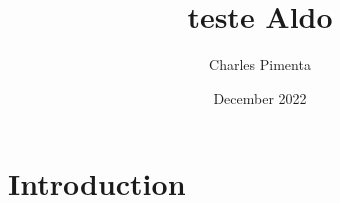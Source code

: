 \documentclass{article}
\title{teste Aldo}
\author{Charles Pimenta}
\date{December 2022}
\begin{document}
\maketitle

\section{Introduction}
\end{document}
